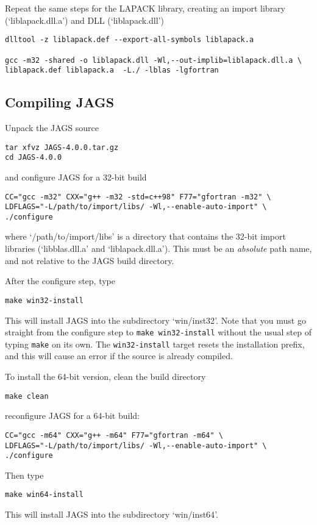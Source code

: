 \documentclass[11pt, a4paper, titlepage]{article}
\newcommand{\JAGS}{\textsf{JAGS}}
\newcommand{\file}[1]{{`\normalfont\textsf{#1}'}}
\begin{document}
Repeat the same steps for the LAPACK library, creating an import library
(\file{liblapack.dll.a}) and DLL (\file{liblapack.dll})
\begin{verbatim}
dlltool -z liblapack.def --export-all-symbols liblapack.a

gcc -m32 -shared -o liblapack.dll -Wl,--out-implib=liblapack.dll.a \
liblapack.def liblapack.a  -L./ -lblas -lgfortran 
\end{verbatim}

\subsection{Compiling \JAGS}

Unpack the JAGS source
\begin{verbatim}
tar xfvz JAGS-4.0.0.tar.gz
cd JAGS-4.0.0
\end{verbatim}
and configure JAGS for a 32-bit build
\begin{verbatim}
CC="gcc -m32" CXX="g++ -m32 -std=c++98" F77="gfortran -m32" \
LDFLAGS="-L/path/to/import/libs/ -Wl,--enable-auto-import" \
./configure
\end{verbatim}
where \file{/path/to/import/libs} is a directory that contains the
32-bit import libraries (\file{libblas.dll.a} and
\file{liblapack.dll.a}).  This must be an {\em absolute} path name,
and not relative to the JAGS build directory.


After the configure step, type
\begin{verbatim}
make win32-install
\end{verbatim}
This will install JAGS into the subdirectory \file{win/inst32}.
Note that you must go straight from the configure step to \texttt{make
  win32-install} without the usual step of typing \texttt{make} on
its own.  The \texttt{win32-install} target resets the installation
prefix, and this will cause an error if the source is already
compiled.

To install the 64-bit version, clean the build directory 
\begin{verbatim}
make clean 
\end{verbatim}
reconfigure JAGS for a 64-bit build:
\begin{verbatim}
CC="gcc -m64" CXX="g++ -m64" F77="gfortran -m64" \
LDFLAGS="-L/path/to/import/libs/ -Wl,--enable-auto-import" \
./configure
\end{verbatim}
Then type
\begin{verbatim}
make win64-install
\end{verbatim}
This will install JAGS into the subdirectory \file{win/inst64}.
\end{document}

